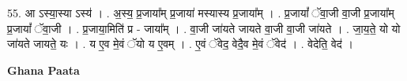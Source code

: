 \documentclass[17pt]{extarticle}
\begin{document}
55. आ ऽस्या॒स्या ऽस्य॑ । . अ॒स्य॒ प्र॒जाया᳚म् प्र॒जाया॑ मस्यास्य प्र॒जाया᳚म् । . प्र॒जायां᳚ ॅवा॒जी वा॒जी प्र॒जाया᳚म् प्र॒जायां᳚ ॅवा॒जी । . प्र॒जाया॒मिति॑ प्र - जाया᳚म् । . वा॒जी जा॑यते जायते वा॒जी वा॒जी जा॑यते । . जा॒य॒ते॒ यो यो जा॑यते जायते॒ यः । . य ए॒व मे॒वं ॅयो य ए॒वम् । . ए॒वं ॅवेद॒ वेदै॒व मे॒वं ॅवेद॑ । . वेदेति॒ वेद॑ । \newline

\textbf{Ghana Paata } \newline
\end{document}
